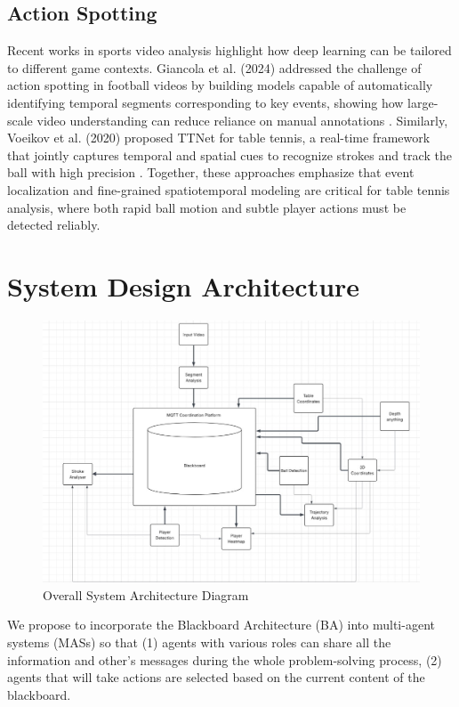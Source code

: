 \documentclass[conference]{IEEEtran}
\begin{document}
\subsection{Action Spotting}

Recent works in sports video analysis highlight how deep learning can be tailored to different game contexts. Giancola et al. (2024) addressed the challenge of action spotting in football videos by building models capable of automatically identifying temporal segments corresponding to key events, showing how large-scale video understanding can reduce reliance on manual annotations \cite{giancola}. Similarly, Voeikov et al. (2020) proposed TTNet for table tennis, a real-time framework that jointly captures temporal and spatial cues to recognize strokes and track the ball with high precision \cite{ttnet}. Together, these approaches emphasize that event localization and fine-grained spatiotemporal modeling are critical for table tennis analysis, where both rapid ball motion and subtle player actions must be detected reliably.

\section{System Design Architecture}
\begin{figure}
    \centering
    \includegraphics[width=1\linewidth]{overall-architecture.png}
    \caption{Overall System Architecture Diagram}
    \label{fig:placeholder}
\end{figure}
We propose to incorporate the Blackboard Architecture (BA) into multi-agent systems (MASs) so that (1) agents with various roles can share all the information and other's messages during the whole problem-solving process, (2) agents that will take actions are selected based on the current content of the blackboard. 
\end{document}
